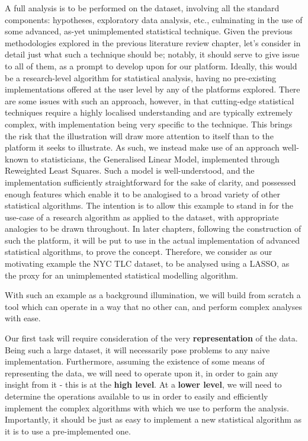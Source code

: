 A full analysis is to be performed on the dataset, involving all the standard components: hypotheses, exploratory data analysis, etc., culminating in the use of some advanced, as-yet unimplemented statistical technique.
Given the previous methodologies explored in the previous literature review chapter, let's consider in detail just what such a technique should be; notably, it should serve to give issue to all of them, as a prompt to develop upon for our platform.
Ideally, this would be a research-level algorithm for statistical analysis, having no pre-existing implementations offered at the user level by any of the platforms explored.
There are some issues with such an approach, however, in that cutting-edge statistical techniques require a highly localised understanding and are typically extremely complex, with implementation being very specific to the technique.
This brings the risk that the illustration will draw more attention to itself than to the platform it seeks to illustrate.
As such, we instead make use of an approach well-known to statisticians, the Generalised Linear Model, implemented through Reweighted Least Squares.
Such a model is well-understood, and the implementation sufficiently straightforward for the sake of clarity, and possessed enough features which enable it to be analogised to a broad variety of other statistical algorithms.
The intention is to allow this example to stand in for the use-case of a research algorithm as applied to the dataset, with appropriate analogies to be drawn throughout.
In later chapters, following the construction of such the platform, it will be put to use in the actual implementation of advanced statistical algorithms, to prove the concept.
Therefore, we consider as our motivating example the NYC TLC dataset, to be analysed using a LASSO, as the proxy for an unimplemented statistical modelling algorithm.

With such an example as a background illumination, we will build from scratch a tool which can operate in a way that no other can, and perform complex analyses with ease.

Our first task will require consideration of the very \textbf{representation} of the data.
Being such a large dataset, it will necessarily pose problems to any naive implementation.
Furthermore, assuming the existence of some means of representing the data, we will need to operate upon it, in order to gain any insight from it - this is at the \textbf{high level}.
At a \textbf{lower level}, we will need to determine the operations available to us in order to easily and efficiently implement the complex algorithms with which we use to perform the analysis.
Importantly, it should be just as easy to implement a new statistical algorithm as it is to use a pre-implemented one.

